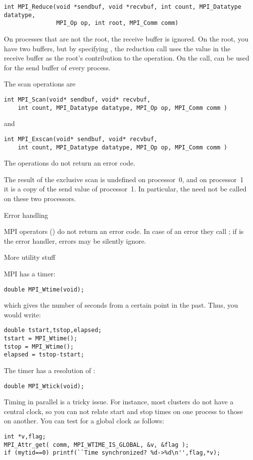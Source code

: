 \begin{verbatim}
int MPI_Reduce(void *sendbuf, void *recvbuf, int count, MPI_Datatype datatype, 
               MPI_Op op, int root, MPI_Comm comm)
\end{verbatim}
On processes that are not the root, the receive buffer is ignored. On the root, 
you have two buffers, but by specifying , the reduction call
uses the value in the receive buffer as the root's contribution to the operation.
On the  call,  can be used for the send buffer of
every process.

The scan operations are
\begin{verbatim}
int MPI_Scan(void* sendbuf, void* recvbuf, 
    int count, MPI_Datatype datatype, MPI_Op op, MPI_Comm comm ) 
\end{verbatim}
and
\begin{verbatim}
int MPI_Exscan(void* sendbuf, void* recvbuf, 
    int count, MPI_Datatype datatype, MPI_Op op, MPI_Comm comm ) 
\end{verbatim}
The  operations do not return an error code.

The result of the exclusive scan is undefined on processor~0,
and on processor~1 it is a copy of the send value of processor~1.
In particular, the  need not be called on these two 
processors.

 {Error handling}

MPI operators () do not return an error code. In case of
an error they call ; if 
is the error handler, errors may be silently ignore.

 {More utility stuff}

MPI has a  timer: 
\begin{verbatim}
double MPI_Wtime(void);
\end{verbatim}
which gives the number of seconds from a certain point in the past.
Thus, you would write:
\begin{verbatim}
double tstart,tstop,elapsed;
tstart = MPI_Wtime();
tstop = MPI_Wtime();
elapsed = tstop-tstart;
\end{verbatim}
The timer has a resolution of :
\begin{verbatim}
double MPI_Wtick(void);
\end{verbatim}
Timing in parallel is a tricky issue. For instance, most clusters do
not have a central clock, so you can not relate start and stop times
on one process to those on another. You can test for a global clock as
follows:
\begin{verbatim}
int *v,flag;
MPI_Attr_get( comm, MPI_WTIME_IS_GLOBAL, &v, &flag );
if (mytid==0) printf(``Time synchronized? %d->%d\n'',flag,*v);
\end{verbatim}

